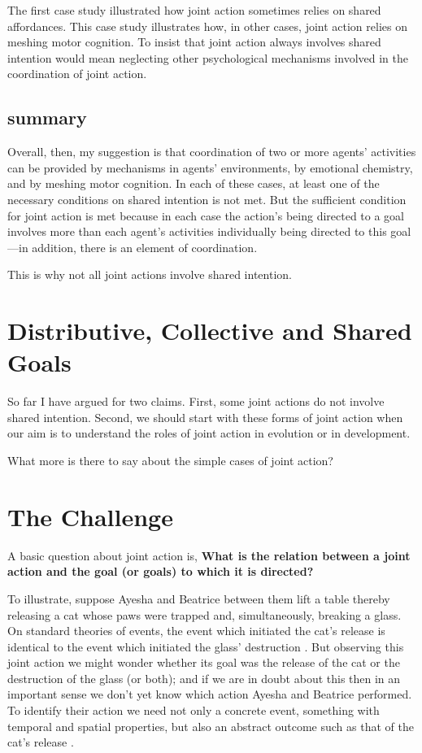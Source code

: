 \documentclass[14pt,a4paper]{extarticle}
\begin{document}
The first case study illustrated how joint action sometimes relies on shared affordances.  This case study illustrates how, in other cases, joint action relies on meshing motor cognition.  To insist that joint action always involves shared intention would mean neglecting other psychological mechanisms involved in the coordination of joint action.




\subsection{summary}

Overall, then, my suggestion is that coordination of two or more agents' activities can be provided by mechanisms in agents' environments, by emotional chemistry, and by meshing motor cognition.  
In each of these cases, 
at least one of the necessary conditions on shared intention is not met.
But the sufficient condition for joint action is met because in each case the action's being directed to a goal involves more than each agent's activities individually being directed to this goal---in addition, there is an element of coordination.

This is why not all joint actions involve shared intention.




\section{Distributive, Collective and Shared Goals}

So far I have argued for two claims. 
First, some joint actions do not involve shared intention.
Second, we should start with these forms of joint action when our aim is to understand the roles of joint action in evolution or in development.

What more is there to say about the simple cases of joint action?

\section{The Challenge}

A basic question about joint action is, 
\textbf{What is the relation between a joint action and the goal (or goals) to which it is directed?}  

To illustrate, suppose Ayesha and Beatrice between them lift a table thereby releasing a cat whose paws were trapped and,  simultaneously, breaking a glass.  On standard theories of events, the event which initiated the cat's release is identical to the event which initiated the glass' destruction \citep{Davidson:1969ie}.  But observing this joint action we might wonder whether its goal was the release of the cat or the destruction of the glass (or both); and if we are in doubt about this then in an important sense we don't yet know which action Ayesha and Beatrice performed.  To identify their action we need not only a concrete event, something with temporal and spatial properties, but also an abstract outcome such as that of the cat's release \citep{Davidson:1971fz}.
\end{document}
